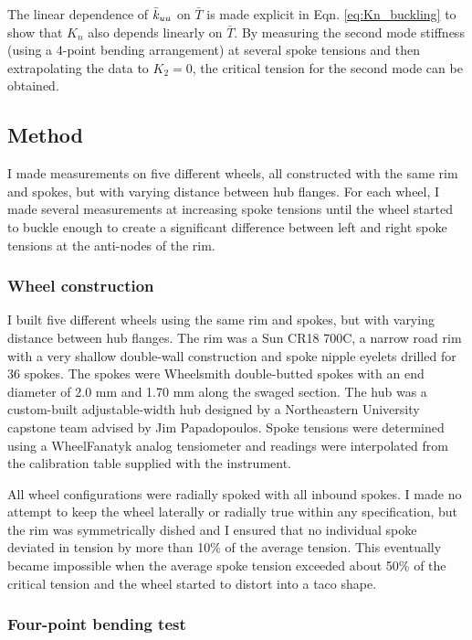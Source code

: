 \documentclass[\rootdir/thesis.tex]{subfiles}
\begin{document}
The linear dependence of $\bar{k}_{uu}$ on $\bar{T}$ is made explicit in Eqn. \eqref{eq:Kn_buckling} to show that $K_n$ also depends linearly on $\bar{T}$. By measuring the second mode stiffness (using a 4-point bending arrangement) at several spoke tensions and then extrapolating the data to $K_2 = 0$, the critical tension for the second mode can be obtained.

\subsection{Method}

I made measurements on five different wheels, all constructed with the same rim and spokes, but with varying distance between hub flanges. For each wheel, I made several measurements at increasing spoke tensions until the wheel started to buckle enough to create a significant difference between left and right spoke tensions at the anti-nodes of the rim.

\subsubsection{Wheel construction}

I built five different wheels using the same rim and spokes, but with varying distance between hub flanges. The rim was a Sun CR18 700C, a narrow road rim with a very shallow double-wall construction and spoke nipple eyelets drilled for 36 spokes. The spokes were Wheelsmith double-butted spokes with an end diameter of 2.0 mm and 1.70 mm along the swaged section. The hub was a custom-built adjustable-width hub designed by a Northeastern University capstone team advised by Jim Papadopoulos. Spoke tensions were determined using a WheelFanatyk analog tensiometer and readings were interpolated from the calibration table supplied with the instrument.

All wheel configurations were radially spoked with all inbound spokes. I made no attempt to keep the wheel laterally or radially true within any specification, but the rim was symmetrically dished and I ensured that no individual spoke deviated in tension by more than 10\% of the average tension. This eventually became impossible when the average spoke tension exceeded about 50\% of the critical tension and the wheel started to distort into a taco shape.

\subsubsection{Four-point bending test}
\end{document}
